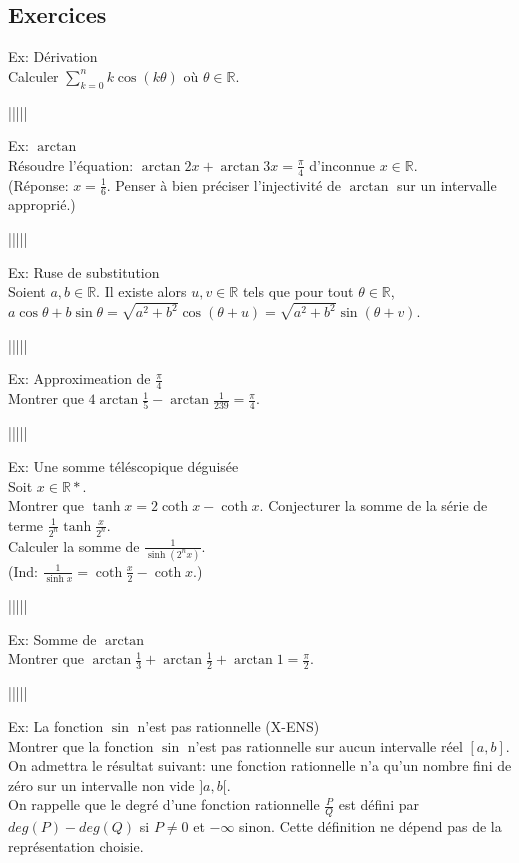 \documentclass{article}
\begin{document}
\subsection{Exercices}
Ex: D\'erivation\\
Calculer $\sum\limits_{k=0}^{n}k\cos(k\theta)$ o\`u $\theta\in\mathbb{R}$.
\begin{center}
|||||
\end{center}
Ex: $\arctan$\\
R\'esoudre l'\'equation: $\arctan{2x}+\arctan{3x}=\frac{\pi}{4}$ d'inconnue $x\in\mathbb{R}$.\\
(R\'eponse: $x=\frac{1}{6}$. Penser \`a bien pr\'eciser l'injectivit\'e de $\arctan$ sur un intervalle appropri\'e.)
\begin{center}
|||||
\end{center}
Ex: Ruse de substitution\\
Soient $a,b\in\mathbb{R}$. Il existe alors $u,v\in\mathbb{R}$ tels que pour tout $\theta\in\mathbb{R}$,\\
$a\cos\theta+b\sin\theta=\sqrt{a^2+b^2}\cos(\theta+u)=\sqrt{a^2+b^2}\sin(\theta+v)$.
\begin{center}
|||||
\end{center}
Ex: Approximeation de $\frac{\pi}{4}$\\
Montrer que $4\arctan\frac{1}{5}-\arctan\frac{1}{239}=\frac{\pi}{4}$.
\begin{center}
|||||
\end{center}
Ex: Une somme t\'el\'escopique d\'eguis\'ee\\
Soit $x\in\mathbb{R*}$.\\
Montrer que $\tanh{x}=2\coth{x}-\coth{x}$. Conjecturer la somme de la s\'erie de terme $\frac{1}{2^n}\tanh\frac{x}{2^n}$.\\
Calculer la somme de $\frac{1}{\sinh(2^nx)}$.\\
(Ind: $\frac{1}{\sinh x}=\coth\frac{x}{2}-\coth x$.)
\begin{center}
|||||
\end{center}
Ex: Somme de $\arctan$\\
Montrer que $\arctan\frac{1}{3}+\arctan\frac{1}{2}+\arctan{1}=\frac{\pi}{2}$.
\begin{center}
|||||
\end{center}
Ex: La fonction $\sin$ n'est pas rationnelle (X-ENS)\\
Montrer que la fonction $\sin$ n'est pas rationnelle sur aucun intervalle r\'eel $[a,b]$.\\
On admettra le r\'esultat suivant: une fonction rationnelle n'a qu'un nombre fini de z\'ero sur un intervalle non vide $]a,b[$.\\
On rappelle que le degr\'e d'une fonction rationnelle $\frac{P}{Q}$ est d\'efini par $deg(P)-deg(Q)$ si $P\neq 0$ et $-\infty$ sinon. Cette d\'efinition ne d\'epend pas de la repr\'esentation choisie.
\end{document}
